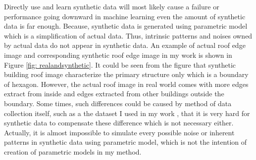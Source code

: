 \documentclass{iitthesis}
\begin{document}
 \label{Learn: introduction}

Directly use and learn synthetic data will most likely cause a failure or performance going downward in machine learning even the amount of synthetic data is far enough. Because, synthetic data is generated using parametric model which is a simplification of actual data. Thus, intrinsic patterns and noises owned by actual data do not appear in synthetic data. An example of actual roof edge image and corresponding synthetic roof edge image in my work \cite{ZX14} is shown in Figure \ref{fig: realandsynthetic}. It could be seen from the figure that synthetic building roof image characterize the primary structure only which is a boundary of hexagon. However, the actual roof image in real world comes with more edges extract from inside and edges extracted from other buildings outside the boundary. Some times, such differences could be caused by method of data collection itself, such as a the dataset I used in my work \cite{ZX:14}, that it is very hard for synthetic data to compensate these difference which is not necessary either. Actually, it is almost impossible to simulate every possible noise or inherent patterns in synthetic data using parametric model, which is not the intention of creation of parametric models in my method.   
\end{document}
